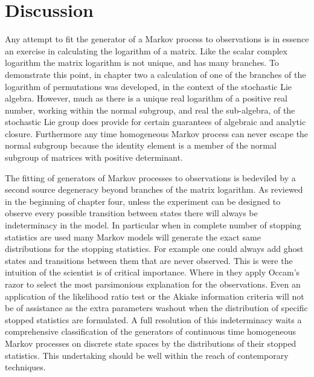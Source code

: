 \section{Discussion}
Any attempt to fit the generator of a Markov process to observations is in essence an 
exercise in calculating the logarithm of a matrix. Like the scalar complex logarithm the
matrix logarithm is not unique, and has many branches. To demonstrate this point, in chapter
two a calculation of one of the branches of the logarithm of permutations was developed, in
the context of the stochastic Lie algebra. However, much as there is a unique real logarithm
of a positive real number, working within the normal subgroup, and real the sub-algebra, of
the stochastic Lie group does provide for certain guarantees of algebraic and analytic
closure. Furthermore any time homogeneous Markov process can never escape the normal
subgroup because the identity element is a member of the normal subgroup of matrices with
positive determinant.

The fitting of generators of Markov processes to observations is bedeviled by a second
source degeneracy beyond branches of the matrix logarithm. As reviewed in the beginning of
chapter four, unless the experiment can be designed to observe every possible transition
between states there will always be indeterminacy in the model. In particular when in 
complete number of stopping statistics are used many Markov models will generate the exact
same distributions for the stopping statistics. For example one could always add ghost
states and transitions between them that are never observed. This is were the intuition of
the scientist is of critical importance. Where in they apply Occam's razor to select the
most parsimonious explanation for the observations. Even an application of the likelihood
ratio test or the Akiake information criteria \cite{akaike_new_1974} will not be of 
assistance as the extra parameters washout when the distribution of specific stopped
statistics are formulated. A full resolution of this indeterminacy waits a comprehensive
classification of the generators of continuous time homogeneous Markov processes on discrete
state spaces by the distributions of their stopped statistics. This undertaking should be
well within the reach of contemporary techniques.

